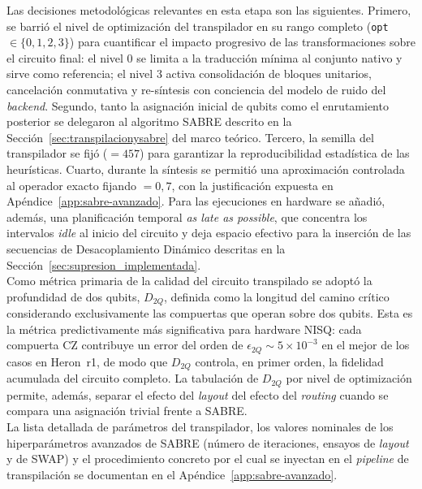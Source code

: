 \documentclass[12pt, spanish]{book}
\begin{document}
Las decisiones metodológicas relevantes en esta etapa son las siguientes. Primero, se barrió el nivel de optimización del transpilador en su rango completo (\texttt{opt}~$\in \{0, 1, 2, 3\}$) para cuantificar el impacto progresivo de las transformaciones sobre el circuito final: el nivel 0 se limita a la traducción mínima al conjunto nativo y sirve como referencia; el nivel 3 activa consolidación de bloques unitarios, cancelación conmutativa y re-síntesis con conciencia del modelo de ruido del \textit{backend}. Segundo, tanto la asignación inicial de qubits como el enrutamiento posterior se delegaron al algoritmo SABRE descrito en la Sección~\ref{sec:transpilacionysabre} del marco teórico. Tercero, la semilla del transpilador se fijó ($=457$) para garantizar la reproducibilidad estadística de las heurísticas. Cuarto, durante la síntesis se permitió una aproximación controlada al operador exacto fijando $=0{,}7$, con la justificación expuesta en Apéndice~\ref{app:sabre-avanzado}. Para las ejecuciones en hardware se añadió, además, una planificación temporal \textit{as late as possible}, que concentra los intervalos \textit{idle} al inicio del circuito y deja espacio efectivo para la inserción de las secuencias de Desacoplamiento Dinámico descritas en la Sección~\ref{sec:supresion_implementada}.\\

Como métrica primaria de la calidad del circuito transpilado se adoptó la profundidad de dos qubits, $D_{2Q}$, definida como la longitud del camino crítico considerando exclusivamente las compuertas que operan sobre dos qubits. Esta es la métrica predictivamente más significativa para hardware NISQ: cada compuerta CZ contribuye un error del orden de $\epsilon_{2Q} \sim 5 \times 10^{-3}$ en el mejor de los casos en Heron~r1, de modo que $D_{2Q}$ controla, en primer orden, la fidelidad acumulada del circuito completo. La tabulación de $D_{2Q}$ por nivel de optimización permite, además, separar el efecto del \textit{layout} del efecto del \textit{routing} cuando se compara una asignación trivial frente a SABRE.\\

La lista detallada de parámetros del transpilador, los valores nominales de los hiperparámetros avanzados de SABRE (número de iteraciones, ensayos de \textit{layout} y de SWAP) y el procedimiento concreto por el cual se inyectan en el \textit{pipeline} de transpilación se documentan en el Apéndice~\ref{app:sabre-avanzado}.
\end{document}
